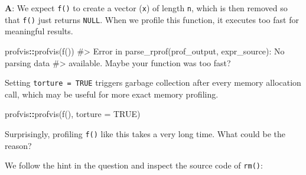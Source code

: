 \documentclass[
]{krantz}
\makeatletter
\newenvironment{Shaded}{\begin{snugshade}}{\end{snugshade}}
\newcommand{\CommentTok}[1]{\textcolor[rgb]{0.56,0.35,0.01}{\textit{#1}}}
\newcommand{\DataTypeTok}[1]{\textcolor[rgb]{0.13,0.29,0.53}{#1}}
\newcommand{\KeywordTok}[1]{\textcolor[rgb]{0.13,0.29,0.53}{\textbf{#1}}}
\newcommand{\NormalTok}[1]{#1}
\newcommand{\OperatorTok}[1]{\textcolor[rgb]{0.81,0.36,0.00}{\textbf{#1}}}
\newcommand{\OtherTok}[1]{\textcolor[rgb]{0.56,0.35,0.01}{#1}}
\newenvironment{kframe}{%
\medskip{}
\setlength{\fboxsep}{.8em}
 \def\at@end@of@kframe{}%
 \ifinner\ifhmode%
  \def\at@end@of@kframe{\end{minipage}}%
  \begin{minipage}{\columnwidth}%
 \fi\fi%
 \def\FrameCommand##1{\hskip\@totalleftmargin \hskip-\fboxsep
 \colorbox{shadecolor}{##1}\hskip-\fboxsep
     \hskip-\linewidth \hskip-\@totalleftmargin \hskip\columnwidth}%
 \MakeFramed {\advance\hsize-\width
   \@totalleftmargin\z@ \linewidth\hsize
   \@setminipage}}%
 {\par\unskip\endMakeFramed%
 \at@end@of@kframe}
\renewenvironment{Shaded}{\begin{kframe}}{\end{kframe}}
\renewcommand{\KeywordTok} [1]{\textcolor[rgb]{0.00,0.44,0.13}{{#1}}}
\renewcommand{\DataTypeTok}[1]{\textcolor[rgb]{0.56,0.13,0.00}{{#1}}}
\renewcommand{\CommentTok} [1]{\textcolor[rgb]{0.38,0.63,0.69}{{#1}}}
\renewcommand{\OtherTok}   [1]{\textcolor[rgb]{0.00,0.44,0.13}{{#1}}}
\renewcommand{\NormalTok}  [1]{{#1}}
\makeatother
\begin{document}
\textbf{{A}}: We expect \texttt{f()} to create a vector (\texttt{x}) of length \texttt{n}, which is then removed so that \texttt{f()} just returns \texttt{NULL}. When we profile this function, it executes too fast for meaningful results.

\begin{Shaded}
\begin{Highlighting}[]
\NormalTok{profvis}\OperatorTok{::}\KeywordTok{profvis}\NormalTok{(}\KeywordTok{f}\NormalTok{())}
\CommentTok{#> Error in parse_rprof(prof_output, expr_source): No parsing data}
\CommentTok{#> available. Maybe your function was too fast?}
\end{Highlighting}
\end{Shaded}

Setting \texttt{torture\ =\ TRUE} triggers garbage collection after every memory allocation call, which may be useful for more exact memory profiling.

\begin{Shaded}
\begin{Highlighting}[]
\NormalTok{profvis}\OperatorTok{::}\KeywordTok{profvis}\NormalTok{(}\KeywordTok{f}\NormalTok{(), }\DataTypeTok{torture =} \OtherTok{TRUE}\NormalTok{)}
\end{Highlighting}
\end{Shaded}

Surprisingly, profiling \texttt{f()} like this takes a very long time. What could be the reason?

We follow the hint in the question and inspect the source code of \texttt{rm()}:
\end{document}
